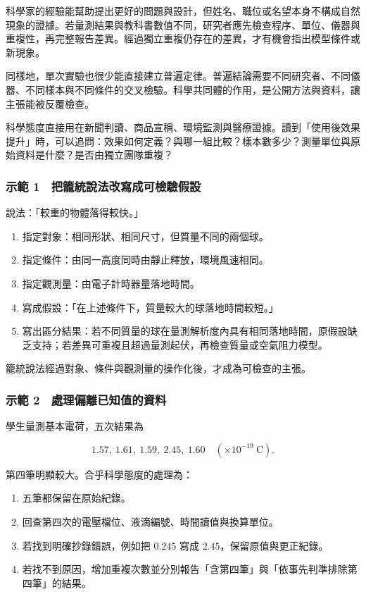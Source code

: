 \documentclass[11pt,a4paper]{article}
\providecommand{\tightlist}{%
  \setlength{\itemsep}{0pt}\setlength{\parskip}{0pt}}
\begin{document}
科學家的經驗能幫助提出更好的問題與設計，但姓名、職位或名望本身不構成自然現象的證據。若量測結果與教科書數值不同，研究者應先檢查程序、單位、儀器與重複性，再完整報告差異。經過獨立重複仍存在的差異，才有機會指出模型條件或新現象。

同樣地，單次實驗也很少能直接建立普遍定律。普遍結論需要不同研究者、不同儀器、不同樣本與不同條件的交叉檢驗。科學共同體的作用，是公開方法與資料，讓主張能被反覆檢查。

科學態度直接用在新聞判讀、商品宣稱、環境監測與醫療證據。讀到「使用後效果提升」時，可以追問：效果如何定義？與哪一組比較？樣本數多少？測量單位與原始資料是什麼？是否由獨立團隊重複？

\subsubsection{示範 1　把籠統說法改寫成可檢驗假設}\label{ux793aux7bc4-1-ux628aux7c60ux7d71ux8aaaux6cd5ux6539ux5bebux6210ux53efux6aa2ux9a57ux5047ux8a2d}

說法：「較重的物體落得較快。」

\begin{enumerate}
\def\labelenumi{\arabic{enumi}.}
\tightlist
\item
  指定對象：相同形狀、相同尺寸，但質量不同的兩個球。
\item
  指定條件：由同一高度同時由靜止釋放，環境風速相同。
\item
  指定觀測量：由電子計時器量落地時間。
\item
  寫成假設：「在上述條件下，質量較大的球落地時間較短。」
\item
  寫出區分結果：若不同質量的球在量測解析度內具有相同落地時間，原假設缺乏支持；若差異可重複且超過量測起伏，再檢查質量或空氣阻力模型。
\end{enumerate}

籠統說法經過對象、條件與觀測量的操作化後，才成為可檢查的主張。

\subsubsection{示範 2　處理偏離已知值的資料}\label{ux793aux7bc4-2-ux8655ux7406ux504fux96e2ux5df2ux77e5ux503cux7684ux8cc7ux6599}

學生量測基本電荷，五次結果為

\[
1.57,\ 1.61,\ 1.59,\ 2.45,\ 1.60
\quad(\times10^{-19}\ \mathrm C).
\]

第四筆明顯較大。合乎科學態度的處理為：

\begin{enumerate}
\def\labelenumi{\arabic{enumi}.}
\tightlist
\item
  五筆都保留在原始紀錄。
\item
  回查第四次的電壓檔位、液滴編號、時間讀值與換算單位。
\item
  若找到明確抄錄錯誤，例如把 \(0.245\) 寫成 \(2.45\)，保留原值與更正紀錄。
\item
  若找不到原因，增加重複次數並分別報告「含第四筆」與「依事先判準排除第四筆」的結果。
\end{enumerate}
\end{document}
